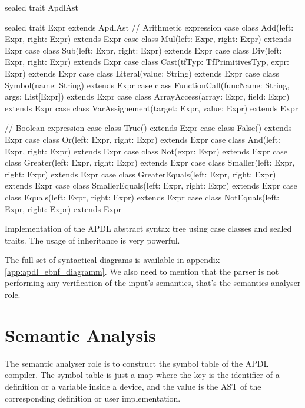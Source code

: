 \begin{listing}[!htbp]
  \centering
  \begin{scalacode}
sealed trait ApdlAst

sealed trait Expr extends ApdlAst
// Arithmetic expression
case class Add(left: Expr, right: Expr) extends Expr
case class Mul(left: Expr, right: Expr) extends Expr
case class Sub(left: Expr, right: Expr) extends Expr
case class Div(left: Expr, right: Expr) extends Expr
case class Cast(tfTyp: TfPrimitivesTyp, expr: Expr) extends Expr
case class Literal(value: String) extends Expr
case class Symbol(name: String) extends Expr
case class FunctionCall(funcName: String, args: List[Expr]) extends Expr
case class ArrayAccess(array: Expr, field: Expr) extends Expr
case class VarAssignement(target: Expr, value: Expr) extends Expr

// Boolean expression
case class True() extends Expr
case class False() extends Expr
case class Or(left: Expr, right: Expr) extends Expr
case class And(left: Expr, right: Expr) extends Expr
case class Not(expr: Expr) extends Expr
case class Greater(left: Expr, right: Expr) extends Expr
case class Smaller(left: Expr, right: Expr) extends Expr
case class GreaterEquals(left: Expr, right: Expr) extends Expr
case class SmallerEquals(left: Expr, right: Expr) extends Expr
case class Equals(left: Expr, right: Expr) extends Expr
case class NotEquals(left: Expr, right: Expr) extends Expr
  \end{scalacode}
  \caption[\gls{APDL} \gls{AST} implementation in Scala]{Implementation of the
\gls{APDL} abstract syntax tree using case classes and sealed traits. The usage
of inheritance is very powerful.}
  \label{lst:ast_implementation}
\end{listing}

The full set of syntactical diagrams is available in appendix
\ref{app:apdl_ebnf_diagramm}. We also need to mention that the parser is not
performing any verification of the input's semantics, that's the semantics
analyser role.

\section{Semantic Analysis}
\label{sec:semantic_analysis}

The semantic analyser role is to construct the symbol table of the \gls{APDL}
compiler. The symbol table is just a map where the key is the identifier of a
definition or a variable inside a device, and the value is the \gls{AST} of the
corresponding definition or user implementation.

